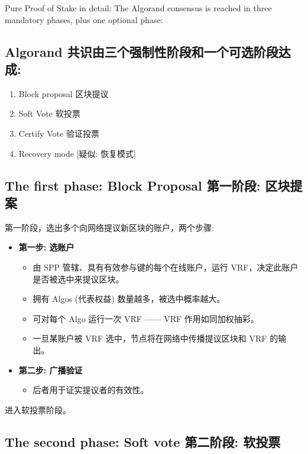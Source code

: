 Pure Proof of Stake in detail: The Algorand consensus is reached in three mandatory phases, plus one optional phase:

\subsection{Algorand 共识由三个强制性阶段和一个可选阶段达成:}

\begin{enumerate}
    \item Block proposal 区块提议
    \item Soft Vote 软投票
    \item Certify Vote 验证投票
    \item Recovery mode [疑似: 恢复模式]
\end{enumerate}

\subsection{The first phase: Block Proposal 第一阶段: 区块提案}

第一阶段，选出多个向网络提议新区块的账户，两个步骤:

\begin{itemize}
    \item \textbf{第一步: 选账户}
    \begin{itemize}
        \item 由 SPP 管辖、具有有效参与键的每个在线账户，运行 VRF，决定此账户是否被选中来提议区块。
        \item 拥有 Algos (代表权益) 数量越多，被选中概率越大。
        \item 可对每个 Algo 运行一次 VRF —— VRF 作用如同加权抽彩。
        \item 一旦某账户被 VRF 选中，节点将在网络中传播提议区块和 VRF 的输出。
    \end{itemize}
    \item \textbf{第二步: 广播验证}
    \begin{itemize}
        \item 后者用于证实提议者的有效性。
    \end{itemize}
\end{itemize}
进入软投票阶段。

\subsection{The second phase: Soft vote 第二阶段: 软投票}


